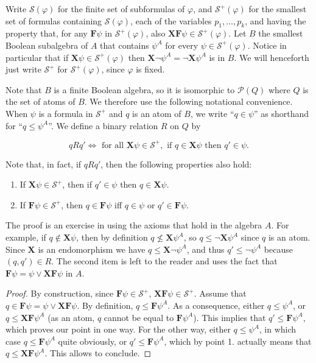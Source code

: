 \documentclass{article}
\newcommand{\X}{\mathbf{X}}
\newcommand{\F}{\mathbf{F}}
\renewcommand{\S}{\mathcal{S}}
\renewcommand{\phi}{\varphi}
\begin{document}
Write $\S(\phi)$ for the finite set of subformulas of $\phi$, and $\S^+(\phi)$
for the smallest set of formulas containing $\S(\phi)$, each of the variables
$p_1, \dots, p_k$, and having the property that, for any $\F\psi$ in
$\S^+(\phi)$, also $\X\F\psi \in \S^+(\phi)$.  Let $B$ the smallest Boolean
subalgebra of $A$ that contains $\psi^A$ for every $\psi \in \S^+(\phi)$. Notice
in particular that if $\X \psi \in \S^+(\phi)$ then $\X \neg \psi^A = \neg \X
\psi^A$ is in $B$. We will henceforth just write $\S^+$ for $\S^+(\phi)$, since
$\phi$ is fixed.

Note that $B$ is a finite Boolean algebra, so it is isomorphic to
$\mathcal{P}(Q)$ where $Q$ is the set of atoms of $B$. We therefore use the
following notational convenience. When $\psi$ is a formula in $\S^+$ and $q$ is
an atom of $B$, we write ``$q \in \psi$'' as shorthand for ``$q \leq \psi^A$''.
We define a binary relation $R$ on $Q$ by

\[ q {R} q' \iff \text{ for all } \X \psi \in \S^+, \text{ if } q \in \X \psi
\text{ then } q' \in \psi.\]

Note that, in fact, if $q {R} q'$, then the following properties also hold:
\begin{enumerate} 
\item If $\X \psi \in \S^+$, then if $q' \in \psi$ then $q \in
	\X \psi$.  

\item If $\F \psi \in \S^+$, then $q \in \F \psi$ iff $q \in \psi$ or $q' \in \F
\psi$.  
\end{enumerate} 

The proof is an exercise in using the axioms that hold
in the algebra $A$. For example, if $q \not\in \X \psi$, then by definition $q
\nleq \X \psi^A$, so $q \leq \neg \X \psi^A$ since $q$ is an atom. Since $\X$ is
an endomorphism we have $q \leq \X \neg \psi^A$, and thus $q' \leq \neg \psi^A$
because $(q,q') \in R$.  The second item is left to the reader and uses the fact
that $\F \psi = \psi \vee \X \F \psi$ in $A$.

\begin{proof}
	By construction, since $\F \psi \in \S^+$, $\X\F\psi\in\S^+$.
	Assume that $q\in\F\psi = \psi\vee\X\F\psi$.
	By definition, $q \leq\F\psi^A$. As a consequence, either $q\leq\psi^A$, or $q\leq\X\F\psi^A$
	(as an atom, $q$ cannot be equal to $\F\psi^A$).
	This implies that $q'\leq\F\psi^A$, which proves our point in one way.
	For the other way, either $q\leq\psi^A$, in which case $q\leq\F\psi^A$ quite obviously,
	or $q'\leq\F\psi^A$, which by point 1. actually means that $q\leq\X\F\psi^A$. This allows to conclude.

\end{proof}
\end{document}
